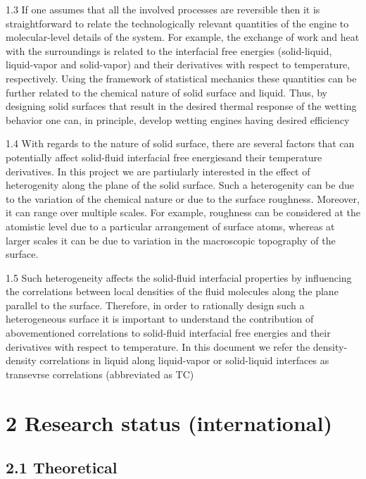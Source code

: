\par 1.3 If one assumes that all the involved processes are reversible then it is straightforward to relate the technologically relevant quantities of the engine to molecular-level details of the system. For example, the exchange of work and heat with the surroundings is related to the interfacial free energies (solid-liquid, liquid-vapor and solid-vapor) and their derivatives with respect to temperature, respectively. Using the framework of statistical mechanics these quantities can be further related to the chemical nature of solid surface and liquid. Thus, by designing solid surfaces that result in the desired thermal response of the wetting behavior one can, in principle, develop wetting engines having desired efficiency
\par 1.4 With regards to the nature of solid surface, there are several factors that can potentially affect solid-fluid interfacial free energiesand their temperature derivatives. In this project we are partiularly interested in the effect of heterogenity along the plane of the solid surface. Such a heterogenity can be due to the variation of the chemical nature or due to the surface roughness. Moreover,  it can range over multiple scales. For example, roughness can be considered at the atomistic level due to a particular arrangement of surface atoms, whereas at larger scales it can be due to variation in the macroscopic topography of the surface.
\par 1.5 Such heterogeneity affects the solid-fluid interfacial properties by influencing the correlations between local densities of the fluid molecules along the plane parallel to the surface. Therefore, in order to rationally design such a heterogeneous surface it is important to understand the contribution of abovementioned correlations to solid-fluid interfacial free energies and their derivatives with respect to temperature. In this document we refer the density-density correlations in liquid along liquid-vapor or solid-liquid interfaces as transevrse correlations (abbreviated as TC)\section{2 Research status (international)}
\subsection{2.1 Theoretical}

